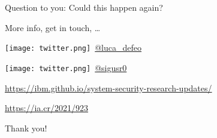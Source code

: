 \documentclass[aspectratio=169]{beamer}
\begin{document}

\begin{frame}{Question to you:}
  \LARGE\centering
  Could this happen again?
\end{frame}


\begin{frame}{More info, get in touch, \dots}
  \large\centering
  
  \begin{description}
    \setlength{\itemsep}{2em}
  \item[Luca:]
    \texttt{[image: twitter.png]}~\href{https://twitter.com/luca_defeo}{@luca\_defeo}
  \item[Ale:]
    \texttt{[image: twitter.png]}~\href{https://twitter.com/sigusr0}{@sigusr0}
  
  \item[Blog:]
    \url{https://ibm.github.io/system-security-research-updates/}
  
  \item[Paper:]
    \url{https://ia.cr/2021/923}
  \end{description}
  
  \Huge\vfill
  Thank you!
\end{frame}
\end{document}
